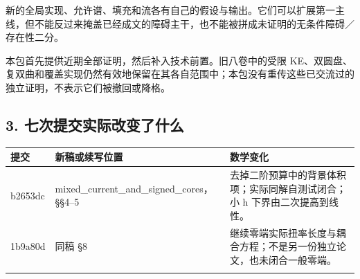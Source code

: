 \documentclass[
  10pt,
]{article}
\begin{document}
新的全局实现、允许谱、填充和流各有自己的假设与输出。它们可以扩展第一主线，但不能反过来掩盖已经成文的障碍主干，也不能被拼成未证明的无条件障碍／存在性二分。

本包首先提供近期全部证明，然后补入技术前置。旧八卷中的受限
KE、双圆盘、复双曲和覆盖实现仍然有效地保留在其各自范围中；本包没有重传这些已交流过的独立证明，不表示它们被撤回或降格。

\hypertarget{ux4e03ux6b21ux63d0ux4ea4ux5b9eux9645ux6539ux53d8ux4e86ux4ec0ux4e48}{%
\subsection{3.
七次提交实际改变了什么}\label{ux4e03ux6b21ux63d0ux4ea4ux5b9eux9645ux6539ux53d8ux4e86ux4ec0ux4e48}}

\begin{longtable}[]{@{}lll@{}}
\toprule
\begin{minipage}[b]{0.30\columnwidth}\raggedright
提交\strut
\end{minipage} & \begin{minipage}[b]{0.30\columnwidth}\raggedright
新稿或续写位置\strut
\end{minipage} & \begin{minipage}[b]{0.30\columnwidth}\raggedright
数学变化\strut
\end{minipage}\tabularnewline
\midrule
\endhead
\begin{minipage}[t]{0.30\columnwidth}\raggedright
b2653dc\strut
\end{minipage} & \begin{minipage}[t]{0.30\columnwidth}\raggedright
mixed\_current\_and\_signed\_cores，§§4--5\strut
\end{minipage} & \begin{minipage}[t]{0.30\columnwidth}\raggedright
去掉二阶预算中的背景体积项；实际同解自测试闭合；小 h
下界由二次提高到线性。\strut
\end{minipage}\tabularnewline
\begin{minipage}[t]{0.30\columnwidth}\raggedright
1b9a80d\strut
\end{minipage} & \begin{minipage}[t]{0.30\columnwidth}\raggedright
同稿 §8\strut
\end{minipage} & \begin{minipage}[t]{0.30\columnwidth}\raggedright
继续零端实际扭率长度与耦合方程；不是另一份独立论文，也未闭合一般零端。\strut
\end{minipage}\tabularnewline
\begin{minipage}[t]{0.30\columnwidth}\raggedright

\end{minipage}
\end{longtable}
\end{document}
